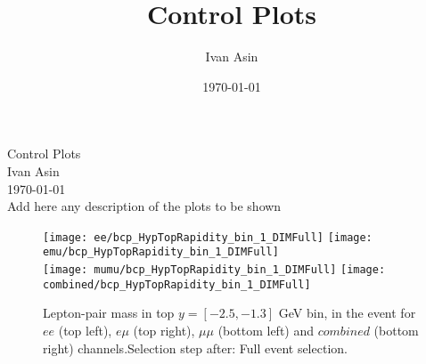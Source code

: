 \documentclass[12pt, a4paper, titlepage]{article}
\title{Control Plots}
\author{Ivan Asin}
\date{\today}
\begin{document}
\begin{titlepage}
\begin{center}
\LARGE{Control Plots}\\
\large{Ivan Asin}\\
\today\\
\vspace{3cm}
Add here any description of the plots to be shown
\end{center}
\end{titlepage}

\clearpage
\newpage


\clearpage
\newpage

% 
% 

\begin{figure}
  \texttt{[image: ee/bcp\_HypTopRapidity\_bin\_1\_DIMFull]}
  \texttt{[image: emu/bcp\_HypTopRapidity\_bin\_1\_DIMFull]}\\
  \texttt{[image: mumu/bcp\_HypTopRapidity\_bin\_1\_DIMFull]}
  \texttt{[image: combined/bcp\_HypTopRapidity\_bin\_1\_DIMFull]}
\caption{Lepton-pair mass in top $y = [-2.5,-1.3]$ GeV bin, in the event for $ee$ (top left), $e\mu$ (top right), $\mu\mu$ (bottom left) and $combined$ (bottom right) channels.\newline Selection step after: Full event selection.}
\end{figure}

\clearpage
\newpage
\end{document}
